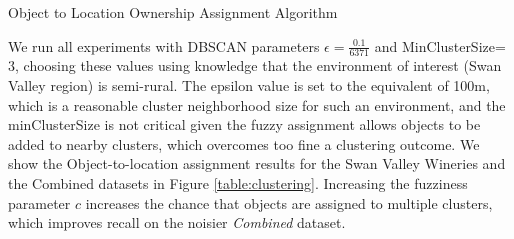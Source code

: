 \begin{algorithm}
	\caption{Object to Location Ownership Assignment Algorithm}
	\label{alg:OwnershipAssignment}
	\begin{algorithmic}
		\State{- - - - - - - - - -}
				\EndFor
			\EndFor
			\EndFor
			\EndFor 
		\EndProcedure
	\end{algorithmic}
\end{algorithm}

We run all experiments with DBSCAN parameters $\epsilon = \frac{0.1}{6371}$ and MinClusterSize=$3$, choosing these values using knowledge that the environment of interest (Swan Valley region) is semi-rural. The epsilon value is set to the equivalent of 100m, which is a reasonable cluster neighborhood size for such an environment, and the minClusterSize is not critical given the fuzzy assignment allows objects to be added to nearby clusters, which overcomes too fine a clustering outcome. 
We show the Object-to-location assignment results for the Swan Valley Wineries and the Combined datasets in Figure \ref{table:clustering}. 
Increasing the fuzziness parameter $c$ increases the chance that objects are assigned to multiple clusters, which improves recall on the noisier \textit{Combined} dataset.

